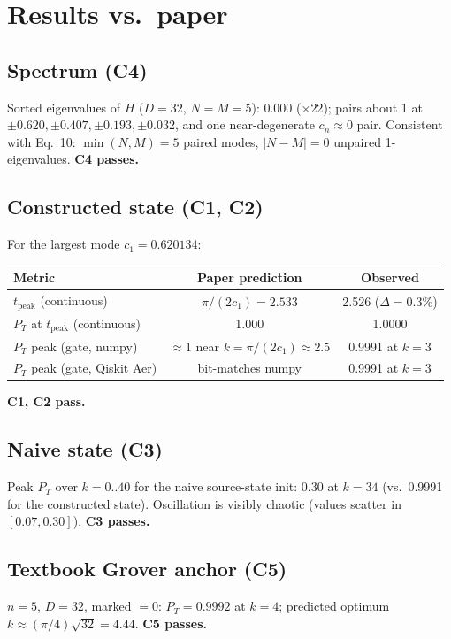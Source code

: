 \documentclass[11pt]{article}
\begin{document}
\section{Results vs.\ paper}

\subsection{Spectrum (C4)}
Sorted eigenvalues of $H$ ($D=32$, $N=M=5$):
$0.000$ ($\times 22$); pairs about 1 at $\pm 0.620, \pm 0.407, \pm 0.193, \pm 0.032$,
and one near-degenerate $c_n \approx 0$ pair.
Consistent with Eq.~10: $\min(N,M)=5$ paired modes, $|N-M|=0$ unpaired 1-eigenvalues.
\textbf{C4 passes.}

\subsection{Constructed state (C1, C2)}
For the largest mode $c_1 = 0.620134$:
\begin{center}
\begin{tabular}{lcc}
\toprule
Metric & Paper prediction & Observed \\
\midrule
$t_\mathrm{peak}$ (continuous) & $\pi/(2 c_1) = 2.533$ & 2.526 ($\Delta = 0.3\%$) \\
$P_T$ at $t_\mathrm{peak}$ (continuous) & 1.000 & 1.0000 \\
$P_T$ peak (gate, numpy)     & $\approx 1$ near $k=\pi/(2 c_1)\approx 2.5$ & 0.9991 at $k=3$ \\
$P_T$ peak (gate, Qiskit Aer) & bit-matches numpy & 0.9991 at $k=3$ \\
\bottomrule
\end{tabular}
\end{center}
\textbf{C1, C2 pass.}

\subsection{Naive state (C3)}
Peak $P_T$ over $k=0..40$ for the naive source-state init:
$\mathbf{0.30}$ at $k=34$ (vs.\ 0.9991 for the constructed state).
Oscillation is visibly chaotic (values scatter in $[0.07, 0.30]$).
\textbf{C3 passes.}

\subsection{Textbook Grover anchor (C5)}
$n=5$, $D=32$, marked $= 0$: $P_T = 0.9992$ at $k = 4$; predicted optimum
$k \approx (\pi/4)\sqrt{32} = 4.44$.
\textbf{C5 passes.}
\end{document}
